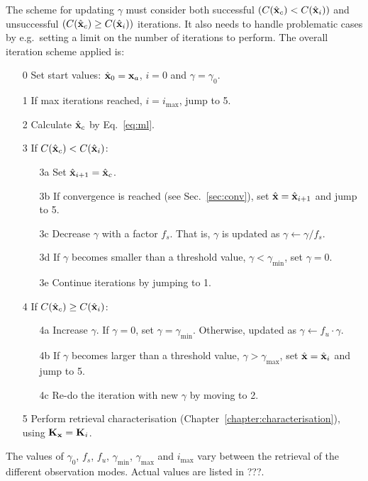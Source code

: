 The scheme for updating $\gamma$ must consider both successful
$(C(\hat{\mathbf{x}}_c) < C(\hat{\mathbf{x}}_i))$ and
unsuccessful $(C(\hat{\mathbf{x}}_c) \geq C(\hat{\mathbf{x}}_i))$ iterations. It also
needs to handle problematic cases by e.g.\ setting a limit on the number of
iterations to perform. The overall iteration scheme applied is:
\begin{itemize}
\item[0] Set start values: $\hat{\mathbf{x}}_0 = \mathbf{x}_{a}$, $i=0$ and $\gamma=\gamma_0$.
\item[1] If max iterations reached, $i=i_\mathrm{max}$, jump to 5. 
\item[2] Calculate $\hat{\mathbf{x}}_c$ by Eq.~\ref{eq:ml}.
\item[3] If $C(\hat{\mathbf{x}}_c) < C(\hat{\mathbf{x}}_i)$:
  \begin{itemize}
  \item[3a] Set $\hat{\mathbf{x}}_{i+1}=\hat{\mathbf{x}}_c$.
  \item[3b] If convergence is reached (see Sec.~\ref{sec:conv}), set
    $\hat{\mathbf{x}}=\hat{\mathbf{x}}_{i+1}$ and jump to 5.
  \item[3c] Decrease $\gamma$ with a factor $f_s$. That is, $\gamma$ is updated
    as $\gamma\leftarrow\gamma/f_s$. 
  \item[3d] If $\gamma$ becomes smaller than a 
    threshold value, $\gamma<\gamma_\mathrm{min}$, set $\gamma=0$.
  \item[3e] Continue iterations by jumping to 1.
  \end{itemize}
\item[4] If $C(\hat{\mathbf{x}}_c) \geq C(\hat{\mathbf{x}}_i)$:
  \begin{itemize}
  \item[4a] Increase $\gamma$. If $\gamma=0$, set $\gamma=\gamma_\mathrm{min}$.
    Otherwise, updated as $\gamma\leftarrow f_u\cdot\gamma$.
  \item[4b] If $\gamma$ becomes larger than a threshold value,
    $\gamma>\gamma_\mathrm{max}$, set $\hat{\mathbf{x}}=\hat{\mathbf{x}}_i$ and jump to 5.
  \item[4c] Re-do the iteration with new $\gamma$ by moving to 2.
  \end{itemize}
\item[5] Perform retrieval characterisation
  (Chapter~\ref{chapter:characterisation}), using $\mathbf{K}_{\mathbf{x}}=\mathbf{K}_{i}$.
\end{itemize}
The values of $\gamma_0$, $f_s$, $f_u$, $\gamma_\mathrm{min}$,
$\gamma_\mathrm{max}$ and $i_\mathrm{max}$ vary between the retrieval of the
different observation modes. Actual values are listed in ???.


